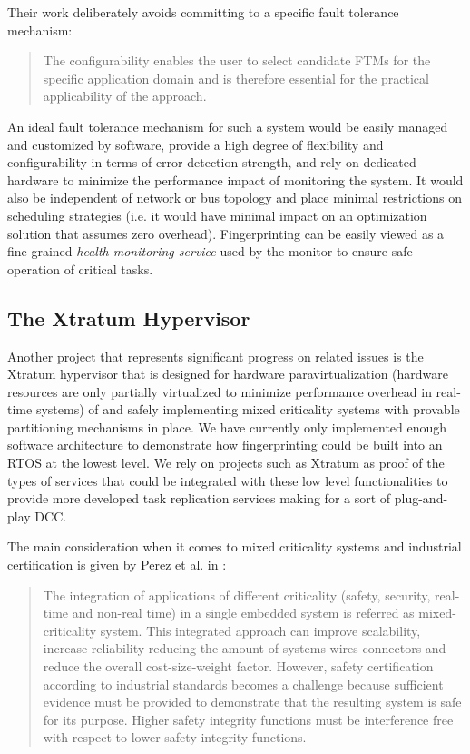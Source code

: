 Their work deliberately avoids committing to a specific fault tolerance mechanism: 
\begin{quote}
The configurability enables the user to select candidate FTMs for
the specific application domain and is therefore essential for the
practical applicability of the approach.
\end{quote}

An ideal fault tolerance mechanism for such a system would be easily managed and customized by software, provide a high degree of flexibility and configurability in terms of error detection strength, and rely on dedicated hardware to minimize the performance impact of monitoring the system. It would also be independent of network or bus topology and place minimal restrictions on scheduling strategies (i.e. it would have minimal impact on an optimization solution that assumes zero overhead). Fingerprinting can be easily viewed as a fine-grained \emph{health-monitoring service} used by the monitor to ensure safe operation of critical tasks.

\subsection{The Xtratum Hypervisor}

Another project that represents significant progress on related issues is the Xtratum hypervisor that is designed for hardware paravirtualization (hardware resources are only partially virtualized to minimize performance overhead in real-time systems) of  and safely implementing mixed criticality systems with provable partitioning mechanisms in place. We have currently only implemented enough software architecture to demonstrate how fingerprinting could be built into an RTOS at the lowest level. We rely on projects such as Xtratum as proof of the types of services that could be integrated with these low level functionalities to provide more developed task replication services making for a sort of plug-and-play DCC. 

The main consideration when it comes to mixed criticality systems and industrial certification is given by Perez et al. in \cite{perez2013safety}:
\begin{quote}The integration of applications of different criticality (safety,
security, real-time and non-real time) in a single embedded
system is referred as mixed-criticality system. This integrated
approach can improve scalability, increase reliability reducing
the amount of systems-wires-connectors and reduce the overall
cost-size-weight factor. However, safety certification according
to industrial standards becomes a challenge because sufficient
evidence must be provided to demonstrate that the resulting
system is safe for its purpose. Higher safety integrity functions
must be interference free with respect to lower safety integrity
functions.
\end{quote}

